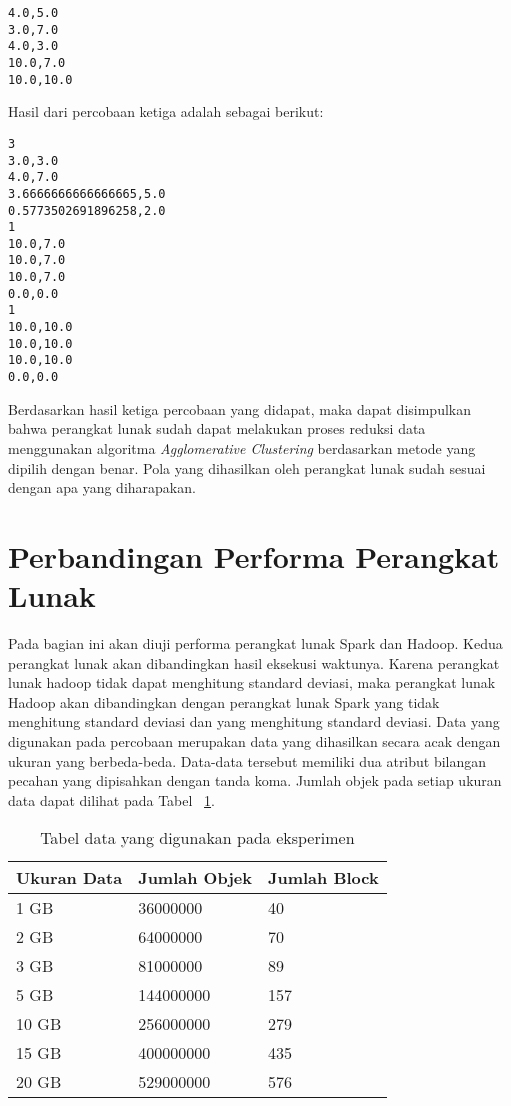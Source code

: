 \begin{itemize}
\begin{verbatim}
4.0,5.0
3.0,7.0
4.0,3.0
10.0,7.0
10.0,10.0
\end{verbatim}

Hasil dari percobaan ketiga adalah sebagai berikut:

\begin{verbatim}
3
3.0,3.0
4.0,7.0
3.6666666666666665,5.0
0.5773502691896258,2.0
1
10.0,7.0
10.0,7.0
10.0,7.0
0.0,0.0
1
10.0,10.0
10.0,10.0
10.0,10.0
0.0,0.0
\end{verbatim}

 
\end{itemize}

Berdasarkan hasil ketiga percobaan yang didapat, maka dapat disimpulkan bahwa perangkat lunak sudah dapat melakukan proses reduksi data menggunakan algoritma \textit{Agglomerative Clustering} berdasarkan metode yang dipilih dengan benar. Pola yang dihasilkan oleh perangkat lunak sudah sesuai dengan apa yang diharapakan.

\section{Perbandingan Performa Perangkat Lunak}

Pada bagian ini akan diuji performa perangkat lunak Spark dan Hadoop. Kedua perangkat lunak akan dibandingkan hasil eksekusi waktunya. Karena perangkat lunak hadoop tidak dapat menghitung standard deviasi, maka perangkat lunak Hadoop akan dibandingkan dengan perangkat lunak Spark yang tidak menghitung standard deviasi dan yang menghitung standard deviasi. Data yang digunakan pada percobaan merupakan data yang dihasilkan secara acak dengan ukuran yang berbeda-beda. Data-data tersebut memiliki dua atribut bilangan pecahan yang dipisahkan dengan tanda koma. Jumlah objek pada setiap ukuran data dapat dilihat pada Tabel ~\ref{tab:exdata}.\\

\begin{table}[H] 
	\centering 
	\caption{Tabel data yang digunakan pada eksperimen}
	\label{tab:exdata}
	\begin{tabular}{|p{2cm}|p{2cm}|p{4cm}|}
\hline
Ukuran Data & Jumlah Objek  & Jumlah Block\\
\hline
1 GB & 36000000 & 40 \\
\hline
2 GB & 64000000 & 70 \\
\hline
3 GB & 81000000 & 89 \\
\hline
5 GB & 144000000 & 157 \\
\hline
10 GB & 256000000 & 279 \\
\hline
15 GB & 400000000 & 435 \\
\hline
20 GB & 529000000 & 576 \\
\hline
	\end{tabular} 
\end{table}



